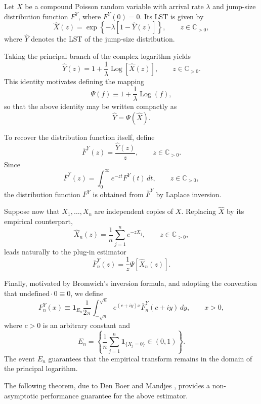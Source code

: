 \documentclass[12pt]{article}
\newcommand{\1}{\mathbf{1}}
\begin{document}
Let $X$ be a compound Poisson random variable with arrival rate $\lambda$ and jump-size distribution function $F^Y$, where $F^Y(0)=0$. Its LST is given by
\[
\widehat X(z)
=
\exp\!\left\{
-\lambda\left[1-\widehat Y(z)\right]
\right\},
\qquad
z\in\mathbb{C}_{>0},
\]
where $\widehat Y$ denotes the LST of the jump-size distribution.

Taking the principal branch of the complex logarithm yields
\[
\widehat Y(z)
=
1+\frac{1}{\lambda}
\operatorname{Log}\!\left[\widehat X(z)\right],
\qquad
z\in\mathbb{C}_{>0}.
\]
This identity motivates defining the mapping
\begin{equation}\label{eq: Psi identity}
\Psi(f)
\equiv
1+\frac{1}{\lambda
}\operatorname{Log}(f),
\end{equation}
so that the above identity may be written compactly as
\[
\widehat Y=\Psi(\widehat X).
\]

To recover the distribution function itself, define
\[
\overline{F}^{Y}(z)
=
\frac{\widehat Y(z)}{z},
\qquad
z\in\mathbb{C}_{>0}.
\]
Since
\[
\overline{F}^{Y}(z)
=
\int_0^\infty e^{-zt}F^{Y}(t)\,dt,
\qquad
z\in\mathbb{C}_{>0},
\]
the distribution function $F^{Y}$ is obtained from $\overline{F}^{Y}$ by Laplace inversion.

Suppose now that $X_1,\ldots,X_n$ are independent copies of $X$. Replacing $\widehat X$ by its empirical counterpart,
\[
\widehat X_n(z)
=
\frac1n
\sum_{j=1}^{n}
e^{-zX_j},
\qquad
z\in\mathbb{C}_{>0},
\]
leads naturally to the plug-in estimator
\[
\overline{F}^{Y}_n(z)
=
\frac1z
\Psi\!\left[\widehat X_n(z)\right].
\]

Finally, motivated by Bromwich's inversion formula, and adopting the convention that $\mathrm{undefined}\cdot0\equiv0$, we define
\begin{equation}
\label{eq: FY estimator}
F_n^Y(x)
\equiv
\mathbf 1_{E_n}
\frac1{2\pi}
\int_{-\sqrt n}^{\sqrt n}
e^{(c+iy)x}
\overline F_n^Y(c+iy)\,dy,
\qquad
x>0,
\end{equation}
where $c>0$ is an arbitrary constant and
\[
E_n
=
\left\{
\frac1n
\sum_{j=1}^{n}
\mathbf1_{\{X_j=0\}}
\in(0,1)
\right\}.
\]
The event $E_n$ guarantees that the empirical transform remains in the domain of the principal logarithm.

The following theorem, due to Den Boer and Mandjes \cite[Theorem~3]{Den Boer2017}, provides a non-asymptotic performance guarantee for the above estimator. %
\end{document}
